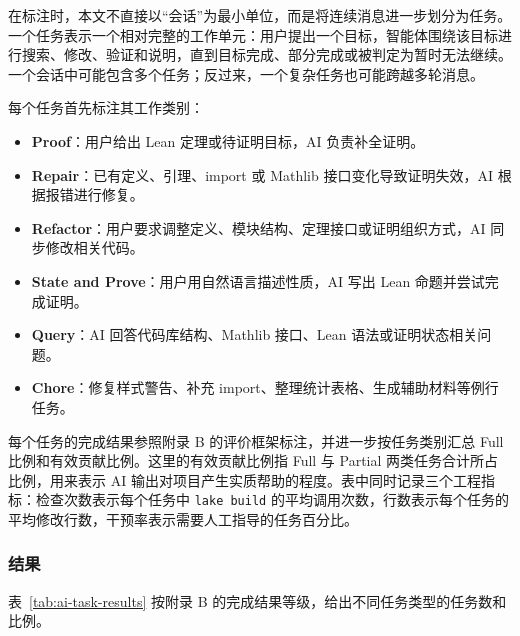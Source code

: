 在标注时，本文不直接以“会话”为最小单位，而是将连续消息进一步划分为任务。一个任务表示一个相对完整的工作单元：用户提出一个目标，智能体围绕该目标进行搜索、修改、验证和说明，直到目标完成、部分完成或被判定为暂时无法继续。一个会话中可能包含多个任务；反过来，一个复杂任务也可能跨越多轮消息。

每个任务首先标注其工作类别：

\begin{itemize}
  \item \textbf{Proof}：用户给出 Lean 定理或待证明目标，AI 负责补全证明。
  \item \textbf{Repair}：已有定义、引理、import 或 Mathlib 接口变化导致证明失效，AI 根据报错进行修复。
  \item \textbf{Refactor}：用户要求调整定义、模块结构、定理接口或证明组织方式，AI 同步修改相关代码。
  \item \textbf{State and Prove}：用户用自然语言描述性质，AI 写出 Lean 命题并尝试完成证明。
  \item \textbf{Query}：AI 回答代码库结构、Mathlib 接口、Lean 语法或证明状态相关问题。
  \item \textbf{Chore}：修复样式警告、补充 import、整理统计表格、生成辅助材料等例行任务。
\end{itemize}

每个任务的完成结果参照附录 B 的评价框架标注，并进一步按任务类别汇总 Full 比例和有效贡献比例。这里的有效贡献比例指 Full 与 Partial 两类任务合计所占比例，用来表示 AI 输出对项目产生实质帮助的程度。表中同时记录三个工程指标：检查次数表示每个任务中 \texttt{lake build} 的平均调用次数，行数表示每个任务的平均修改行数，干预率表示需要人工指导的任务百分比。

\subsubsection{结果}

表~\ref{tab:ai-task-results} 按附录 B 的完成结果等级，给出不同任务类型的任务数和比例。

